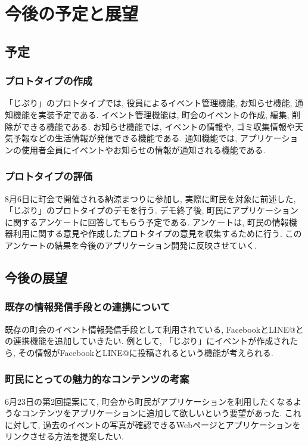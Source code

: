 \chapter{今後の予定と展望}

\section{予定}
\subsection{プロトタイプの作成}
「じぷり」のプロトタイプでは, 役員によるイベント管理機能, お知らせ機能, 通知機能を実装予定である. イベント管理機能は, 町会のイベントの作成, 編集, 削除ができる機能である. お知らせ機能では, イベントの情報や, ゴミ収集情報や天気予報などの生活情報が発信できる機能である. 通知機能では, アプリケーションの使用者全員にイベントやお知らせの情報が通知される機能である.
\subsection{プロトタイプの評価}
8月6日に町会で開催される納涼まつりに参加し, 実際に町民を対象に前述した, 「じぷり」のプロトタイプのデモを行う. デモ終了後, 町民にアプリケーションに関するアンケートに回答してもらう予定である. アンケートは, 町民の情報機器利用に関する意見や作成したプロトタイプの意見を収集するために行う. このアンケートの結果を今後のアプリケーション開発に反映させていく.

\section{今後の展望}
\subsection{既存の情報発信手段との連携について}
既存の町会のイベント情報発信手段として利用されている, FacebookとLINE@との連携機能を追加していきたい. 例として, 「じぷり」にイベントが作成されたら, その情報がFacebookとLINE@に投稿されるという機能が考えられる.
\subsection{町民にとっての魅力的なコンテンツの考案}
6月23日の第2回提案にて, 町会から町民がアプリケーションを利用したくなるようなコンテンツをアプリケーションに追加して欲しいという要望があった. これに対して, 過去のイベントの写真が確認できるWebページとアプリケーションをリンクさせる方法を提案したい. 
